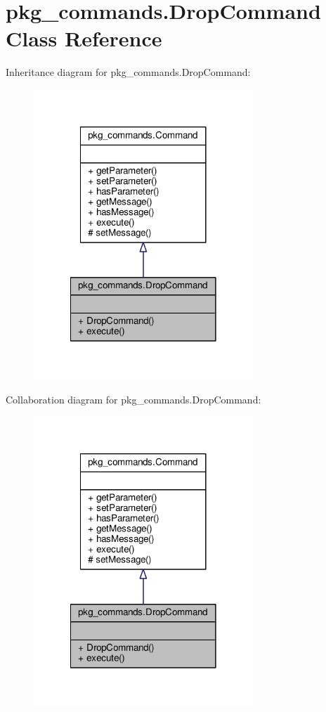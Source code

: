 \hypertarget{classpkg__commands_1_1DropCommand}{\section{pkg\-\_\-commands.\-Drop\-Command Class Reference}
\label{classpkg__commands_1_1DropCommand}
}


Inheritance diagram for pkg\-\_\-commands.\-Drop\-Command\-:
\nopagebreak
\begin{figure}[H]
\begin{center}
\leavevmode
\includegraphics[width=234pt]{classpkg__commands_1_1DropCommand__inherit__graph}
\end{center}
\end{figure}


Collaboration diagram for pkg\-\_\-commands.\-Drop\-Command\-:
\nopagebreak
\begin{figure}[H]
\begin{center}
\leavevmode
\includegraphics[width=234pt]{classpkg__commands_1_1DropCommand__coll__graph}
\end{center}
\end{figure}

